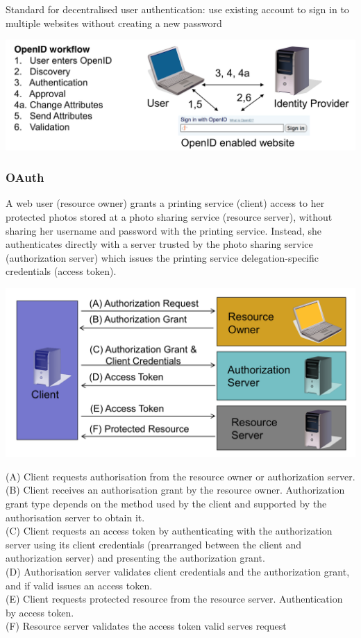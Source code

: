 \documentclass[fs, footer]{latex4ei}
\begin{document}
\begin{multicols*}{4}
Standard for decentralised user authentication:
use existing account to sign in to multiple websites without creating a new password

\includegraphics[width=\columnwidth]{img/OpenID.png}

\subsubsection{OAuth}
A web user (resource owner) grants a
printing service (client) access to her protected photos stored at a photo sharing service (resource server), without sharing her username and password with the printing service.
Instead, she authenticates directly with a server trusted by the photo sharing service (authorization server) which issues the printing service delegation-specific credentials (access token).

\includegraphics[width=\columnwidth]{img/OAuth.png}

(A) Client requests authorisation from the resource owner or authorization server. \\
(B) Client receives an authorisation grant by the resource owner. Authorization grant type depends on the method used by the client and supported by the authorisation server to obtain it. \\
(C) Client requests an access token by authenticating with the authorization server using its client credentials (prearranged between the client and authorization server) and presenting the authorization grant. \\
(D) Authorisation server validates  client credentials and the authorization grant, and if valid issues an access token.\\
(E) Client requests protected resource from the resource server. Authentication by access token.\\
(F) Resource server validates the access token \ra valid \ra serves request\\


\end{multicols*}
\end{document}

